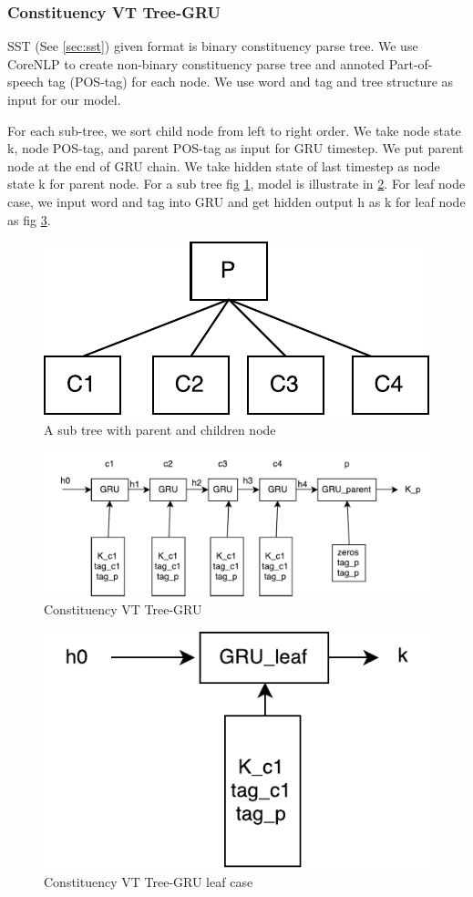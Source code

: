 \subsubsection{Constituency VT Tree-GRU} \label{sec:VTtreeConstituency}
SST (See \ref{sec:sst}) given format is binary constituency parse tree. We use CoreNLP \cite{manning2014stanford} to create non-binary constituency parse tree and annoted Part-of-speech tag (POS-tag) for each node. We use word and tag and tree structure as input for our model.

For each sub-tree, we sort child node from left to right order. We take node state k, node POS-tag, and parent POS-tag as input for GRU timestep. We put parent node at the end of GRU chain. We take hidden state of last timestep as node state k for parent node. For a sub tree fig \ref{fig:treecp}, model is illustrate in \ref{fig:cvtgru}. For leaf node case, we input word and tag into GRU and get hidden output h as k for leaf node as fig \ref{fig:gruleaf}.
\begin{figure}[H]
	\centering
	\includegraphics[width=0.5\linewidth]{figure/treecp}
	\caption[A sub tree with parent and children node]{A sub tree with parent and children node}
	\label{fig:treecp}
\end{figure}

\begin{figure}[H]
	\centering
	\includegraphics[width=0.7\linewidth]{figure/cvtgru}
	\caption[Constituency VT Tree-GRU]{Constituency VT Tree-GRU}
	\label{fig:cvtgru}
\end{figure}

\begin{figure}[H]
	\centering
	\includegraphics[width=0.4\linewidth]{figure/gruleaf}
	\caption[Constituency VT Tree-GRU leaf case]{Constituency VT Tree-GRU leaf case}
	\label{fig:gruleaf}
\end{figure}



